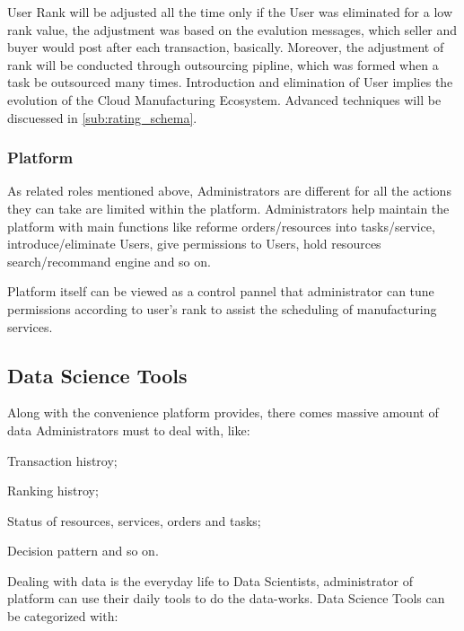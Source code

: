 User Rank will be adjusted all the time only if the User was eliminated for a low rank value, the adjustment was based on the evalution messages, which seller and buyer would post after each transaction, basically. Moreover, the adjustment of rank will be conducted through outsourcing pipline, which was formed when a task be outsourced many times. Introduction and elimination of User implies the evolution of the Cloud Manufacturing Ecosystem. Advanced techniques will be discuessed in \autoref{sub:rating_schema}.

\subsubsection{Platform}
As related roles mentioned above, Administrators are different for all the actions they can take are limited within the platform. Administrators help maintain the platform with main functions like reforme orders/resources into tasks/service, introduce/eliminate Users, give permissions to Users, hold resources search/recommand engine and so on.

Platform itself can be viewed as a control pannel that administrator can tune permissions according to user's rank to assist the scheduling of manufacturing services. 

\subsection{Data Science Tools}
Along with the convenience platform provides, there comes massive amount of data Administrators must to deal with, like:
\begin{inparaenum}[1)]
  \item Transaction histroy;
  \item Ranking histroy;
  \item Status of resources, services, orders and tasks;
  \item Decision pattern and so on.
\end{inparaenum}

Dealing with data is the everyday life to Data Scientists, administrator of platform can use their daily tools to do the data-works. Data Science Tools can be categorized with:

